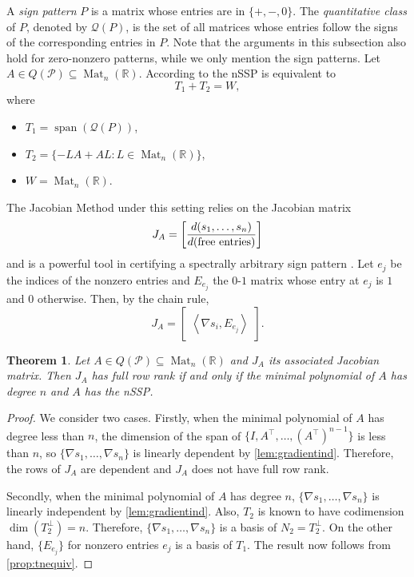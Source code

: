 \documentclass{article}
\newtheorem{theorem}{Theorem}[section]
\theoremstyle{definition}
\newcommand{\trans}{^\top}
\newcommand{\inp}[2]{\left\langle#1,#2\right\rangle}
\newcommand{\vspan}{\operatorname{span}}
\newcommand{\mat}[1][n]{\operatorname{Mat}_{#1}(\mathbb{R})}
\begin{document}
A \emph{sign pattern} $P$ is a matrix whose entries are in $\{+,-,0\}$.  The \emph{quantitative class} of $P$, denoted by $\mathcal{Q}(P)$, is the set of all matrices whose entries follow the signs of the corresponding entries in $P$.  Note that the arguments in this subsection also hold for zero-nonzero patterns, while we only mention the sign patterns.  Let $A\in Q(\mathcal{P}) \subseteq \mat$.  According to \cite[Section~5]{bifur} the nSSP is equivalent to 
\[T_1 + T_2 = W,\]
where
\begin{itemize}
    \item $T_1 = \vspan(\mathcal{Q}(P))$, 
    \item $T_2 = \{-LA + AL: L\in\mat\}$, 
    \item $W = \mat$.
\end{itemize}

The Jacobian Method under this setting relies on the  Jacobian matrix
\begin{align*}
    J_A = \begin{bmatrix}
        \displaystyle{\frac{d(s_1,\ldots, s_n)}{d({\rm free\ entries})}}
    \end{bmatrix}
\end{align*}
and is a powerful tool in certifying a spectrally arbitrary sign pattern \cite{DJOvdD00,GB13,bifur}.
Let $e_j$ be the indices of the nonzero entries and $E_{e_j}$ the $0$-$1$ matrix whose entry at $e_j$ is $1$ and $0$ otherwise.  Then, by the chain rule, 
\[
    J_A = \begin{bmatrix}
        \inp{\nabla s_i}{E_{e_j}}
    \end{bmatrix}.
\]

\begin{theorem}
\label{thm.Jac-nSSP}
Let $A\in Q(\mathcal{P}) \subseteq \mat$ and $J_A$ its associated Jacobian matrix. Then $J_A$ has full row rank if and only if the minimal polynomial of $A$ has degree $n$ and $A$ has the nSSP.
\end{theorem}
\begin{proof}
We consider two cases.  Firstly, when the minimal polynomial of $A$ has degree less than $n$, the dimension of the span of $\{I, A\trans, \ldots, (A\trans)^{n-1}\}$ is less than $n$, so $\{\nabla s_1, \ldots, \nabla s_n\}$ is linearly dependent by \cref{lem:gradientind}.  Therefore, the rows of $J_A$ are dependent and $J_A$ does not have full row rank.  

Secondly, when the minimal polynomial of $A$ has degree $n$, $\{\nabla s_1, \ldots, \nabla s_n\}$ is linearly independent by \cref{lem:gradientind}.  Also, $T_2$ is known to have codimension $\dim(T_2^\perp) = n$.  Therefore, $\{\nabla s_1, \ldots, \nabla s_n\}$ is a basis of $N_2 = T_2^\perp$.  On the other hand, $\{E_{e_j}\}$ for nonzero entries $e_j$ is a basis of $T_1$.  The result now follows from \cref{prop:tnequiv}.
\end{proof}
\end{document}
